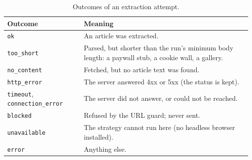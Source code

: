 \begin{table}[ht]
\centering
\small
\caption{Outcomes of an extraction attempt.}
\label{tab:fetch-outcomes}
\begin{tabularx}{\linewidth}{@{}lX@{}}
\toprule
Outcome & Meaning \\
\midrule
\texttt{ok}                & An article was extracted. \\
\texttt{too\_short}        & Parsed, but shorter than the run's minimum
                             body length: a paywall stub, a cookie wall,
                             a gallery. \\
\texttt{no\_content}       & Fetched, but no article text was found. \\
\texttt{http\_error}       & The server answered 4xx or 5xx (the status
                             is kept). \\
\texttt{timeout}, \texttt{connection\_error} & The server did not
                             answer, or could not be reached. \\
\texttt{blocked}           & Refused by the URL guard; never sent. \\
\texttt{unavailable}       & The strategy cannot run here (no headless
                             browser installed). \\
\texttt{error}             & Anything else. \\
\bottomrule
\end{tabularx}
\end{table}
